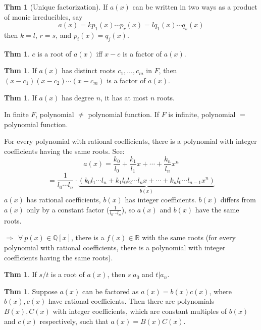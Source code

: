 \documentclass{article}
\theoremstyle{definition}
\newtheorem{theorem}[definition]{Thm}
\begin{document}
\begin{theorem}[Unique factorization]
    If $a(x)$ can be written in two ways as a product of monic irreducibles, say
    $$a(x) = k p_1(x) \cdots p_r(x) = l q_1(x) \cdots q_s(x)$$
    then $k=l$, $r=s$, and $p_i(x) = q_j(x)$.
\end{theorem}

\begin{theorem}
    $c$ is a root of $a(x)$ iff $x - c$ is a factor of $a(x)$.
\end{theorem}
\begin{theorem}
    If $a(x)$ has distinct roots $c_1, \ldots, c_m$ in $F$, then $(x-c_1)(x-c_2)\cdots(x-c_m)$ is a factor of $a(x)$.
\end{theorem}

\begin{theorem}
    If $a(x)$ has degree $n$, it has at most $n$ roots.
\end{theorem}

In finite $F$, polynomial $\neq$ polynomial function. If $F$ is infinite, polynomial $=$ polynomial function.

For every polynomial with rational coefficients, there is a polynomial with integer coefficients having the same roots. See:
$$a(x) = \frac{k_0}{l_0} + \frac{k_1}{l_1} x + \cdots + \frac{k_n}{l_n} x^n$$
$$=\frac{1}{l_0 \cdots l_n} \cdot \underbrace{(k_0 l_1 \cdots l_n + k_1 l_0 l_2 \cdots l_n x + \cdots + k_n l_0 \cdots l_{n-1} x^n)}_{b(x)}$$
$a(x)$ has rational coefficients, $b(x)$ has integer coefficients. $b(x)$ differs from $a(x)$ only by a constant factor ($\frac{1}{l_0\cdots l_n}$), so $a(x)$ and $b(x)$ have the same roots.

$\Longrightarrow~~\forall~p(x) \in \mathbb{Q}[x]$, there is a $f(x) \in \mathbb{R}$ with the same roots (for every polynomial with rational coefficients, there is a polynomial with integer coefficients having the same roots).

\begin{theorem}
    If $s/t$ is a root of $a(x)$, then $s|a_0$ and $t|a_n$.
\end{theorem}

\begin{theorem}
    Suppose $a(x)$ can be factored as $a(x) = b(x)c(x)$, where $b(x), c(x)$ have rational coefficients. Then there are polynomials $B(x), C(x)$ with integer coefficients, which are constant multiples of $b(x)$ and $c(x)$ respectively, such that $a(x) = B(x)C(x)$.
\end{theorem}
\end{document}
